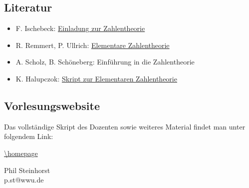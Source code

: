 \subsection*{Literatur}
\label{sub:lit}
\begin{itemize}
	\item F. Ischebeck: \href{http://wwwmath.uni-muenster.de/u/ischebeck/}{Einladung zur Zahlentheorie}
	\item R. Remmert, P. Ullrich: \href{http://link.springer.com/book/10.1007/978-3-7643-7731-1}{Elementare Zahlentheorie}
	\item A. Scholz, B. Schöneberg: Einführung in die Zahlentheorie
	\item K. Halupczok: \href{http://wwwmath.uni-muenster.de/u/karin.halupczok/ElZthSS2009Skript.pdf}{Skript zur Elementaren Zahlentheorie}
\end{itemize}

\subsection*{Vorlesungswebsite}
\label{sub:link}
Das vollständige Skript des Dozenten sowie weiteres Material findet man unter folgendem Link:
\begin{center}
	\url{\homepage}
\end{center}


\vfill
\begin{flushright}
	Phil Steinhorst \\
	p.st@wwu.de
\end{flushright}
\newpage